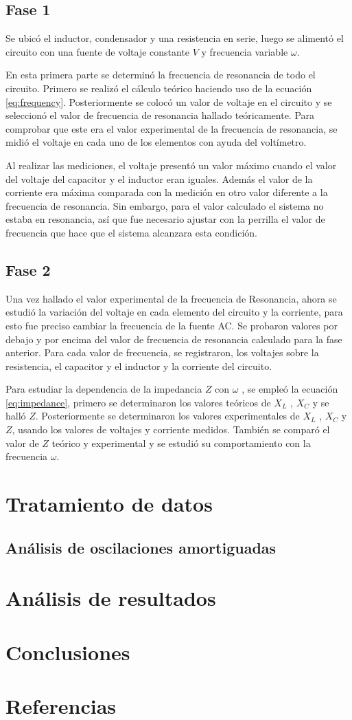 \documentclass[spanish,notitlepage,letterpaper, 12pt]{article}
\begin{document}
\subsection{Fase 1} \label{M.F1}
Se ubicó el inductor, condensador y una resistencia en serie, luego se alimentó el circuito con una fuente de voltaje constante
$V$ y frecuencia variable $\omega$.\par
\bigskip
En esta primera parte se determinó la frecuencia de resonancia de todo el circuito. Primero se realizó el cálculo teórico haciendo uso de la ecuación \eqref{eq:frequency}.
Posteriormente se colocó un valor de voltaje en el circuito y se seleccionó el
valor de frecuencia de resonancia hallado teóricamente. Para comprobar que
este era el valor experimental de la frecuencia de resonancia, se midió el
voltaje en cada uno de los elementos con ayuda del voltímetro.\par 
\bigskip
Al realizar las
mediciones, el voltaje presentó un valor máximo cuando el valor del
voltaje del capacitor y el inductor eran iguales. Además el valor de la corriente
era máxima comparada con la medición en otro valor diferente a la
frecuencia de resonancia. Sin embargo, para el valor calculado el sistema no
estaba en resonancia, así que fue necesario ajustar con la perrilla el valor de frecuencia que hace que el
sistema alcanzara esta condición.
\subsection{Fase 2} \label{M.F2}
Una vez hallado el valor experimental de la frecuencia de Resonancia,
ahora se estudió la variación del voltaje en cada elemento del circuito y la
corriente, para esto fue preciso cambiar la frecuencia de la fuente AC. Se probaron valores
por debajo y por encima del valor de frecuencia de resonancia calculado para la
fase anterior. Para cada valor de frecuencia, se registraron, los voltajes sobre la resistencia, el capacitor y el inductor y la corriente del circuito.\par 
\bigskip
Para estudiar la
dependencia de la impedancia $Z$ con $\omega$ , se empleó la ecuación \eqref{eq:impedance}, primero se determinaron
los valores teóricos de $X_L$ , $X_C$ y se halló $Z$. Posteriormente se determinaron los valores
experimentales de $X_L$ , $X_C$ y $Z$, usando los valores de voltajes y corriente
medidos. También se comparó el valor de $Z$ teórico y experimental y se estudió su
comportamiento con la frecuencia $\omega$.
\section{Tratamiento de datos} \label{TD}
\subsection{Análisis de oscilaciones amortiguadas}
\section{Análisis de resultados}
\section{Conclusiones}
\section{Referencias} 


\end{document}
